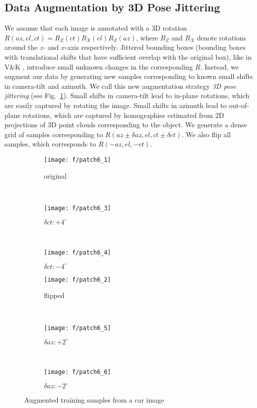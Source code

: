 \documentclass[10pt,twocolumn,letterpaper]{article}
\begin{document}
	\subsection{Data Augmentation by 3D Pose Jittering}
	\label{sec:augmentation}
	We assume that each image is annotated with a 3D rotation $R(az, el, ct) = R_Z(ct) R_X(el) R_Z(az)$, where $R_Z$ and $R_X$ denote rotations around the $z$- and $x$-axis respectively. Jittered bounding boxes (bounding boxes with translational shifts that have sufficient overlap with the original box), like in V\&K \cite{Tulsiani:CVPR15}, introduce small unknown changes in the corresponding $R$. Instead, we augment our data by generating new samples corresponding to known small shifts in camera-tilt and azimuth. We call this new augmentation strategy \emph{3D pose jittering} (see Fig.~\ref{fig:data_augmentation}). Small shifts in camera-tilt lead to in-plane rotations, which are easily captured by rotating the image. Small shifts in azimuth lead to out-of-plane rotations, which are captured by homographies estimated from 2D projections of 3D point clouds corresponding to the object. We generate a dense grid of samples corresponding to $R(az \pm \delta az, el, ct \pm \delta ct)$. We also flip all samples, which corresponds to $R(-az, el, -ct)$. 
	\begin{figure}[h]
		\centering
		\begin{subfigure}{0.31\linewidth}
			\texttt{[image: f/patch6\_1]}
			\caption{original}
		\end{subfigure}
		~
		\begin{subfigure}{0.31\linewidth}
			\texttt{[image: f/patch6\_3]}
			\caption{$\delta ct: +4^\circ$}
		\end{subfigure}
		~
		\begin{subfigure}{0.31\linewidth}
			\texttt{[image: f/patch6\_4]}
			\caption{$\delta ct: -4^\circ$}
		\end{subfigure}
		
		\begin{subfigure}{0.31\linewidth}
			\texttt{[image: f/patch6\_2]}
			\caption{flipped}
		\end{subfigure}
		~
		\begin{subfigure}{0.31\linewidth}
			\texttt{[image: f/patch6\_5]}
			\caption{$\delta az: +2^\circ$}
		\end{subfigure}
		~
		\begin{subfigure}{0.31\linewidth}
			\texttt{[image: f/patch6\_6]}
			\caption{$\delta az: -2^\circ$}
		\end{subfigure}
		\caption{Augmented training samples from a car image}
		\label{fig:data_augmentation}
	\end{figure}
\end{document}
